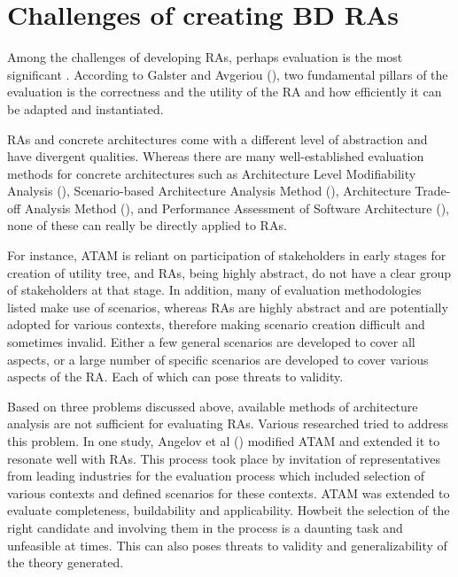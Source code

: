 \documentclass{ieeeaccess}
\begin{document}
\section{Challenges of creating BD RAs}

Among the challenges of developing RAs, perhaps evaluation is the most significant \cite{Maier}. According to Galster and Avgeriou (\cite{galster2011empirically}), two fundamental pillars of the evaluation is the correctness and the utility of the RA and how efficiently it can be adapted and instantiated. 

RAs and concrete architectures come with a different level of abstraction and have divergent qualities. Whereas there are many well-established evaluation methods for concrete architectures such as Architecture Level Modifiability Analysis (\cite{Bengtsson}), Scenario-based Architecture Analysis Method (\cite{kazman1994saam}), Architecture Trade-off Analysis Method (\cite{KazmanATAM}), and Performance Assessment of Software Architecture (\cite{Williams}), none of these can really be directly applied to RAs. 

For instance, ATAM is reliant on participation of stakeholders in early stages for creation of utility tree, and RAs, being highly abstract, do not have a clear group of stakeholders at that stage. In addition, many of evaluation methodologies listed make use of scenarios, whereas RAs are highly abstract and are potentially adopted for various contexts, therefore making scenario creation difficult and sometimes invalid. Either a few general scenarios are developed to cover all aspects, or a large number of specific scenarios are developed to cover various aspects of the RA. Each of which can pose threats to validity.

Based on three problems discussed above, available methods of architecture analysis are not sufficient for evaluating RAs. Various researched tried to address this problem. In one study, Angelov et al (\cite{angelov2008towards}) modified ATAM and extended it to resonate well with RAs. This process took place by invitation of representatives from leading industries for the evaluation process which included selection of various contexts and defined scenarios for these contexts. ATAM was extended to evaluate completeness, buildability and applicability. Howbeit the selection of the right candidate and involving them in the process is a daunting task and unfeasible at times. This can also poses threats to validity and generalizability of the theory generated. 
\end{document}
